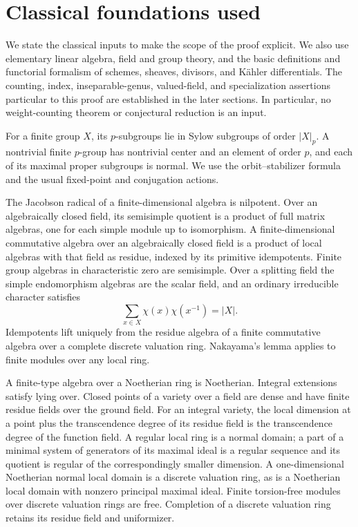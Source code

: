 \section{Classical foundations used}\label{sec:foundations}

We state the classical inputs to make the scope of the proof explicit. We also use elementary linear algebra, field and group theory, and the basic definitions and functorial formalism of schemes, sheaves, divisors, and K\"ahler differentials. The counting, index, inseparable-genus, valued-field, and specialization assertions particular to this proof are established in the later sections. In particular, no weight-counting theorem or conjectural reduction is an input.

\begin{foundation}\label{foundation:groups}
For a finite group $X$, its $p$-subgroups lie in Sylow subgroups of order $|X|_p$. A nontrivial finite $p$-group has nontrivial center and an element of order $p$, and each of its maximal proper subgroups is normal. We use the orbit--stabilizer formula and the usual fixed-point and conjugation actions.
\end{foundation}

\begin{foundation}\label{foundation:algebra}
The Jacobson radical of a finite-dimensional algebra is nilpotent. Over an algebraically closed field, its semisimple quotient is a product of full matrix algebras, one for each simple module up to isomorphism. A finite-dimensional commutative algebra over an algebraically closed field is a product of local algebras with that field as residue, indexed by its primitive idempotents. Finite group algebras in characteristic zero are semisimple. Over a splitting field the simple endomorphism algebras are the scalar field, and an ordinary irreducible character satisfies
\[
 \sum_{x\in X}\chi(x)\chi(x^{-1})=|X|.
\]
Idempotents lift uniquely from the residue algebra of a finite commutative algebra over a complete discrete valuation ring. Nakayama's lemma applies to finite modules over any local ring.
\end{foundation}

\begin{foundation}\label{foundation:commalg}
A finite-type algebra over a Noetherian ring is Noetherian. Integral extensions satisfy lying over. Closed points of a variety over a field are dense and have finite residue fields over the ground field. For an integral variety, the local dimension at a point plus the transcendence degree of its residue field is the transcendence degree of the function field. A regular local ring is a normal domain; a part of a minimal system of generators of its maximal ideal is a regular sequence and its quotient is regular of the correspondingly smaller dimension. A one-dimensional Noetherian normal local domain is a discrete valuation ring, as is a Noetherian local domain with nonzero principal maximal ideal. Finite torsion-free modules over discrete valuation rings are free. Completion of a discrete valuation ring retains its residue field and uniformizer.
\end{foundation}


